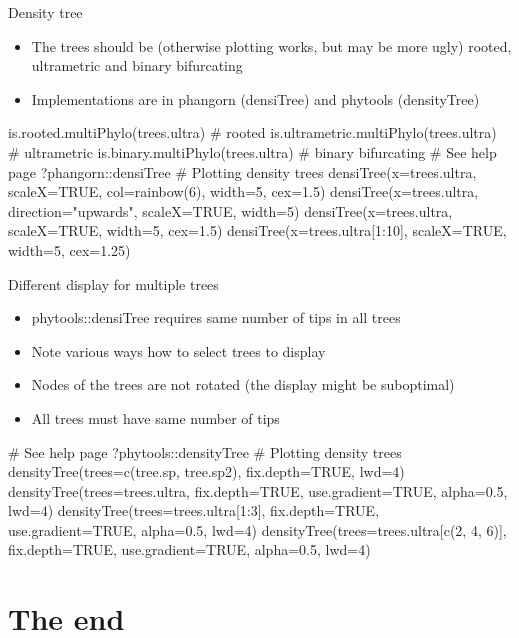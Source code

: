 \documentclass[compress, ucs, xelatex, 11pt, xcolor=x11names, aspectratio=169,
	hyperref={
		bookmarks=true,
		unicode=true,
		colorlinks=true,
		pdftitle={HybSeq course},
		plainpages=false,
		pdfauthor={Vojtech Zeisek},
		pdfsubject={Practical processing of HybSeq target enrichment sequencing data on computing grids like MetaCentrum},
		pdfcreator={XeLaTeX},
		pdfkeywords={BASH, command line, GNU, HybSeq, Linux, MetaCentrum, sequencing shell, target enrichment},
		linkcolor=Turquoise4, %
		anchorcolor=DodgerBlue4, %
		citecolor=DodgerBlue4, %
		filecolor=DodgerBlue4, %
		menucolor=Tan4, %
		urlcolor=DarkOliveGreen4, %
		pdftex},
	url={hyphens, lowtilde} %
	]{beamer}
\renewcommand{\texttt}[1]{\colorbox{Cornsilk2}{{\ttfamily #1}}}
\begin{document}
\begin{frame}[fragile]{Density tree}
	\begin{itemize}
		\item The trees should be (otherwise plotting works, but may be more ugly) rooted, ultrametric and binary bifurcating
		\item Implementations are in \texttt{phangorn} (\texttt{densiTree}) and \texttt{phytools} (\texttt{densityTree})
	\end{itemize}
	\begin{spluscode}
    is.rooted.multiPhylo(trees.ultra) # rooted
    is.ultrametric.multiPhylo(trees.ultra) # ultrametric
    is.binary.multiPhylo(trees.ultra) # binary bifurcating
    # See help page
    ?phangorn::densiTree
    # Plotting density trees
    densiTree(x=trees.ultra, scaleX=TRUE, col=rainbow(6), width=5, cex=1.5)
    densiTree(x=trees.ultra, direction="upwards", scaleX=TRUE, width=5)
    densiTree(x=trees.ultra, scaleX=TRUE, width=5, cex=1.5)
    densiTree(x=trees.ultra[1:10], scaleX=TRUE, width=5, cex=1.25)
	\end{spluscode}
\end{frame}

\begin{frame}[fragile]{Different display for multiple trees}
	\begin{itemize}
		\item \texttt{phytools::densiTree} requires same number of tips in all trees
		\item Note various ways how to select trees to display
		\item Nodes of the trees are not rotated (the display might be suboptimal)
		\item All trees must have same number of tips
	\end{itemize}
	\begin{spluscode}
    # See help page
    ?phytools::densityTree
    # Plotting density trees
    densityTree(trees=c(tree.sp, tree.sp2), fix.depth=TRUE, lwd=4)
    densityTree(trees=trees.ultra, fix.depth=TRUE, use.gradient=TRUE,
      alpha=0.5, lwd=4)
    densityTree(trees=trees.ultra[1:3], fix.depth=TRUE, use.gradient=TRUE,
      alpha=0.5, lwd=4)
    densityTree(trees=trees.ultra[c(2, 4, 6)], fix.depth=TRUE,
      use.gradient=TRUE, alpha=0.5, lwd=4)
	\end{spluscode}
\end{frame}

\section{The end}
\end{document}
